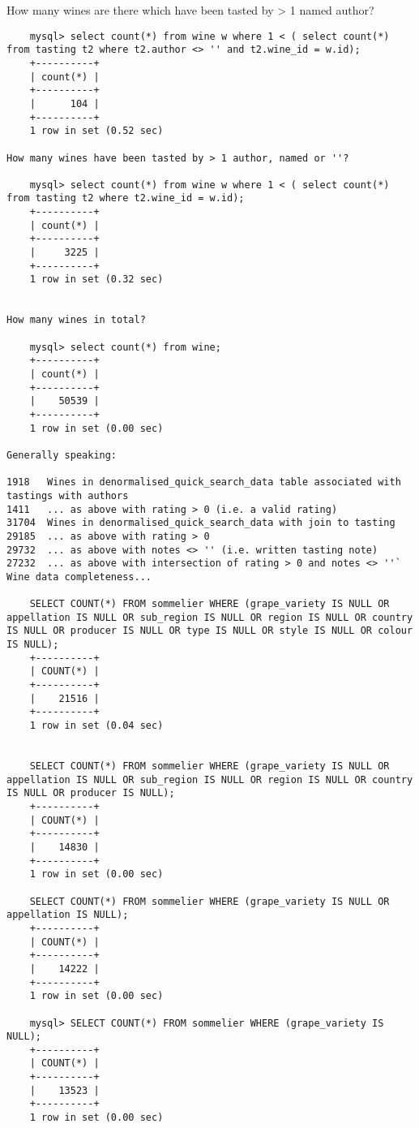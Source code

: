 How many wines are there which have been tasted by > 1 named author?

\begin{verbatim}
    mysql> select count(*) from wine w where 1 < ( select count(*) from tasting t2 where t2.author <> '' and t2.wine_id = w.id);
    +----------+
    | count(*) |
    +----------+
    |      104 |
    +----------+
    1 row in set (0.52 sec)

How many wines have been tasted by > 1 author, named or ''?

    mysql> select count(*) from wine w where 1 < ( select count(*) from tasting t2 where t2.wine_id = w.id);
    +----------+
    | count(*) |
    +----------+
    |     3225 |
    +----------+
    1 row in set (0.32 sec)


How many wines in total?

    mysql> select count(*) from wine;
    +----------+
    | count(*) |
    +----------+
    |    50539 |
    +----------+
    1 row in set (0.00 sec)

Generally speaking:

1918   Wines in denormalised_quick_search_data table associated with tastings with authors
1411   ... as above with rating > 0 (i.e. a valid rating)
31704  Wines in denormalised_quick_search_data with join to tasting
29185  ... as above with rating > 0
29732  ... as above with notes <> '' (i.e. written tasting note)
27232  ... as above with intersection of rating > 0 and notes <> ''`
Wine data completeness...

    SELECT COUNT(*) FROM sommelier WHERE (grape_variety IS NULL OR appellation IS NULL OR sub_region IS NULL OR region IS NULL OR country IS NULL OR producer IS NULL OR type IS NULL OR style IS NULL OR colour IS NULL);
    +----------+
    | COUNT(*) |
    +----------+
    |    21516 |
    +----------+
    1 row in set (0.04 sec)


    SELECT COUNT(*) FROM sommelier WHERE (grape_variety IS NULL OR appellation IS NULL OR sub_region IS NULL OR region IS NULL OR country IS NULL OR producer IS NULL);
    +----------+
    | COUNT(*) |
    +----------+
    |    14830 |
    +----------+
    1 row in set (0.00 sec)

    SELECT COUNT(*) FROM sommelier WHERE (grape_variety IS NULL OR appellation IS NULL);
    +----------+
    | COUNT(*) |
    +----------+
    |    14222 |
    +----------+
    1 row in set (0.00 sec)

    mysql> SELECT COUNT(*) FROM sommelier WHERE (grape_variety IS NULL);
    +----------+
    | COUNT(*) |
    +----------+
    |    13523 |
    +----------+
    1 row in set (0.00 sec)


\end{verbatim}
